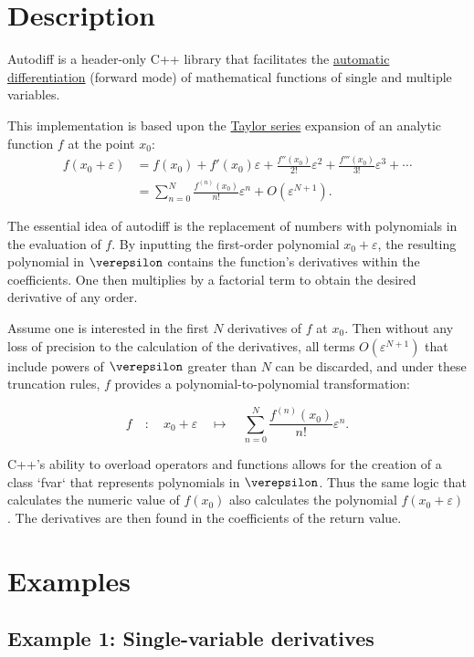 \documentclass{article}
\begin{document}
\section{Description}

Autodiff is a header-only C++ library that facilitates the
\href{https://en.wikipedia.org/wiki/Automatic_differentiation}{automatic differentiation} (forward mode) of
mathematical functions of single and multiple variables.

This implementation is based upon the \href{https://en.wikipedia.org/wiki/Taylor_series}{Taylor series} expansion of
an analytic function $f$ at the point $x_0$:
\begin{align*}
f(x_0+\varepsilon) &= f(x_0) + f'(x_0)\varepsilon + \frac{f''(x_0)}{2!}\varepsilon^2 + \frac{f'''(x_0)}{3!}\varepsilon^3 + \cdots \\
  &= \sum_{n=0}^N\frac{f^{(n)}(x_0)}{n!}\varepsilon^n + O\left(\varepsilon^{N+1}\right).
\end{align*}

The essential idea of autodiff is the replacement of numbers with polynomials in the evaluation of $f$. By inputting
the first-order polynomial $x_0+\varepsilon$, the resulting polynomial in $\verepsilon$ contains the function's
derivatives within the coefficients. One then multiplies by a factorial term to obtain the desired derivative of
any order.

Assume one is interested in the first $N$ derivatives of $f$ at $x_0$. Then without any loss of precision to the
calculation of the derivatives, all terms $O\left(\varepsilon^{N+1}\right)$ that include powers of $\verepsilon$
greater than $N$ can be discarded, and under these truncation rules, $f$ provides a polynomial-to-polynomial
transformation:

\[ f\quad:\quad x_0+\varepsilon\quad\mapsto\quad\sum_{n=0}^N\frac{f^{(n)}(x_0)}{n!}\varepsilon^n. \]

C++'s ability to overload operators and functions allows for the creation of a class `fvar` that represents
polynomials in $\verepsilon$. Thus the same logic that calculates the numeric value of $f(x_0)$ also calculates
the polynomial $f(x_0+\varepsilon)$. The derivatives are then found in the coefficients of the return value.

\section{Examples}

\subsection{Example 1: Single-variable derivatives}
\end{document}
